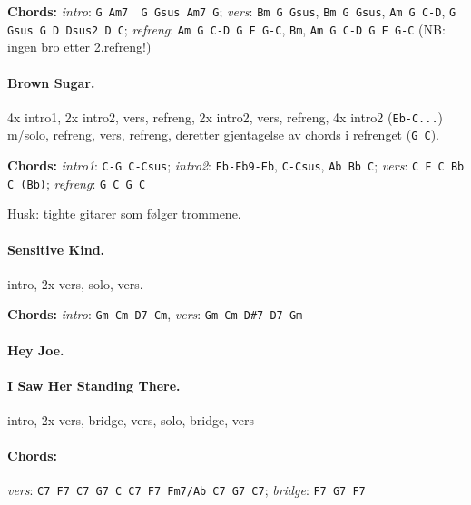 \documentclass[%
twoside,                 %
final,                   %
10pt]{article}
\begin{document}
\textbf{Chords:} \emph{intro}: \Verb!G Am7  G Gsus Am7 G!;
\emph{vers}: \Verb!Bm G Gsus!, \Verb!Bm G Gsus!, \Verb!Am G C-D!, \Verb!G Gsus G D Dsus2 D C!;
\emph{refreng}: \Verb!Am G C-D G F G-C!, \Verb!Bm!, \Verb!Am G C-D G F G-C!
(NB: ingen bro etter 2.refreng!)





\paragraph{Brown Sugar.}
4x intro1, 2x intro2, vers, refreng, 2x intro2, vers, refreng, 4x intro2 (\Verb!Eb-C...!) m/solo, refreng, vers, refreng, deretter gjentagelse av chords i refrenget (\Verb!G C!).

\textbf{Chords:} \emph{intro1}: \Verb!C-G C-Csus!; \emph{intro2}: \Verb!Eb-Eb9-Eb!, \Verb!C-Csus!, \Verb!Ab Bb C!;
\emph{vers}: \Verb!C F C Bb C (Bb)!; \emph{refreng}: \Verb!G C G C!

Husk: tighte gitarer som følger trommene.




\paragraph{Sensitive Kind.}
intro, 2x vers, solo, vers.

\textbf{Chords:} \emph{intro}: \Verb!Gm Cm D7 Cm!, \emph{vers}: \Verb!Gm Cm D#7-D7 Gm!





\paragraph{Hey Joe.}
\paragraph{I Saw Her Standing There.}
intro, 2x vers, bridge, vers, solo, bridge, vers

\paragraph{Chords:}
\emph{vers}: \Verb!C7 F7 C7 G7 C C7 F7 Fm7/Ab C7 G7 C7!; \emph{bridge}: \Verb!F7 G7 F7!
\end{document}
